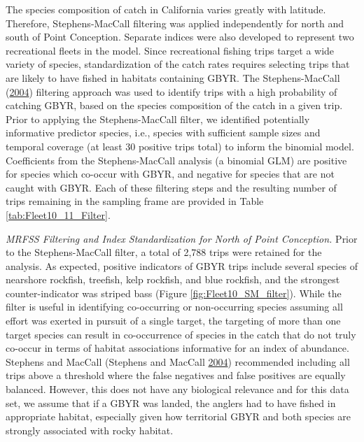 \documentclass[12pt,]{article}
\begin{document}
The species composition of catch in California varies greatly with
latitude. Therefore, Stephens-MacCall filtering was applied
independently for north and south of Point Conception. Separate indices
were also developed to represent two recreational fleets in the model.
Since recreational fishing trips target a wide variety of species,
standardization of the catch rates requires selecting trips that are
likely to have fished in habitats containing GBYR. The Stephens-MacCall
(\protect\hyperlink{ref-Stephens2004}{2004}) filtering approach was used
to identify trips with a high probability of catching GBYR, based on the
species composition of the catch in a given trip. Prior to applying the
Stephens-MacCall filter, we identified potentially informative predictor
species, i.e., species with sufficient sample sizes and temporal
coverage (at least 30 positive trips total) to inform the binomial
model. Coefficients from the Stephens-MacCall analysis (a binomial GLM)
are positive for species which co-occur with GBYR, and negative for
species that are not caught with GBYR. Each of these filtering steps and
the resulting number of trips remaining in the sampling frame are
provided in Table \ref{tab:Fleet10_11_Filter}.

\emph{MRFSS Filtering and Index Standardization for North of Point
Conception.} Prior to the Stephens-MacCall filter, a total of 2,788
trips were retained for the analysis. As expected, positive indicators
of GBYR trips include several species of nearshore rockfish, treefish,
kelp rockfish, and blue rockfish, and the strongest counter-indicator
was striped bass (Figure \ref{fig:Fleet10_SM_filter}). While the filter
is useful in identifying co-occurring or non-occurring species assuming
all effort was exerted in pursuit of a single target, the targeting of
more than one target species can result in co-occurrence of species in
the catch that do not truly co-occur in terms of habitat associations
informative for an index of abundance. Stephens and MacCall (Stephens
and MacCall \protect\hyperlink{ref-Stephens2004}{2004}) recommended
including all trips above a threshold where the false negatives and
false positives are equally balanced. However, this does not have any
biological relevance and for this data set, we assume that if a GBYR was
landed, the anglers had to have fished in appropriate habitat,
especially given how territorial GBYR and both species are strongly
associated with rocky habitat.
\end{document}
